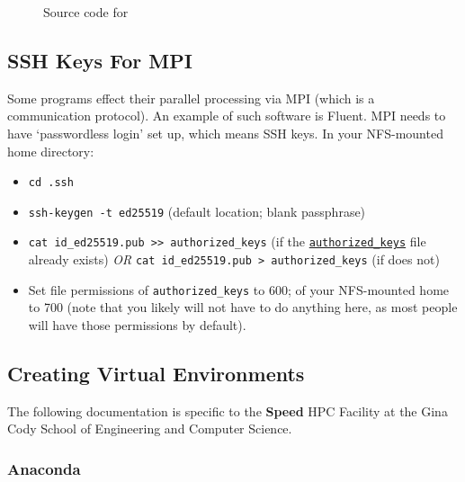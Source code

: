 \documentclass{easychair}
\begin{document}
\begin{figure}[htpb]
    
    \caption{Source code for }
	\label{fig:tmpdir.sh}
\end{figure}

\subsection{SSH Keys For MPI}

Some programs effect their parallel processing via MPI (which is a 
communication protocol). An example of such software is Fluent. MPI needs to 
have `passwordless login' set up, which means SSH keys. In your NFS-mounted 
home directory:

\begin{itemize}
\item
\texttt{cd .ssh}
\item
\texttt{ssh-keygen -t ed25519} (default location; blank passphrase) 
\item
\texttt{cat id\_ed25519.pub >> authorized\_keys} (if the \texttt{\href{https://www.ssh.com/academy/ssh/authorized-keys-file}{authorized\_keys}}
file already exists) \emph{OR} \texttt{cat id\_ed25519.pub > authorized\_keys} (if does not) 
\item
Set file permissions of \texttt{authorized\_keys} to 600; of your NFS-mounted home
to 700 (note that you likely will not have to do anything here, as most people
will have those permissions by default). 
\end{itemize}

\subsection{Creating Virtual Environments}
\label{sect:environments}

The following documentation is specific to the \textbf{Speed} HPC Facility at the
Gina Cody School of Engineering and Computer Science.

\subsubsection{Anaconda}
\end{document}
